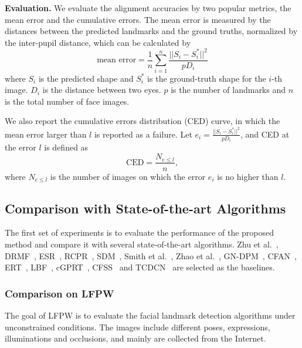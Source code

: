 \documentclass[journal]{IEEEtran}
\begin{document}
\textbf{Evaluation.}
We evaluate the alignment accuracies by two popular metrics, the mean error and the cumulative errors.
The mean error is measured by the distances between the predicted landmarks and the ground truths, normalized by the inter-pupil distance,
 which can be calculated by
\begin{equation}
\text{mean \ error} = \frac{1}{n} \sum_{i=1}^n \frac{ ||S_i - S^{*}_i||^2}{pD_i}
\end{equation}
where $S_i$ is the predicted shape and $S_i^{*}$ is the ground-truth shape for the $i$-th image. $D_i$ is the distance between two eyes. $p$ is the number of landmarks and $n$ is the total number of face images.

We also report the cumulative errors distribution (CED) curve, in which the mean error larger than $l$ is reported as a failure. Let $e_i =\frac{ ||S_i - S^{*}_i||^2}{pD_i}$, and CED at the error $l$ is defined as
\begin{equation}
\text{CED} = \frac{N_{e \leq l}}{n},
\end{equation}
where $N_{e \leq l}$ is the number of images on which the error $e_i$ is no higher than $l$.


\subsection{Comparison with State-of-the-art Algorithms}
The first set of experiments is to evaluate the performance of the proposed method and compare it with several state-of-the-art algorithms. Zhu et al.~\cite{zhu2012face},  DRMF~\cite{asthana2013robust}, ESR~\cite{cao2014face}, RCPR~\cite{burgos2013robust}, SDM~\cite{sdm}, Smith et al.~\cite{smith2014nonparametric}, Zhao et al.~\cite{zhao2014unified}, GN-DPM~\cite{tzimiropoulos2014gauss}, CFAN~\cite{zhang2014coarse}, ERT~\cite{kazemi2014one}, LBF~\cite{lbf}, cGPRT~\cite{lee2015face}, CFSS~\cite{cfss} and TCDCN~\cite{zhang2015learning} are selected as the baselines.



\subsubsection{Comparison on LFPW}
The goal of LFPW is to evaluate the facial landmark detection algorithms under unconstrained conditions. The images include different poses, expressions, illuminations and occlusions, and mainly are collected from the Internet.
\end{document}
